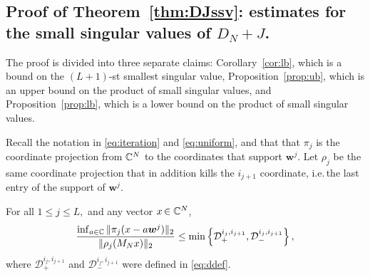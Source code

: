 \documentclass{amsart}
\numberwithin{equation}{section}
\def\corAB{}
\def\corOZ{}
\begin{document}
\subsection{ Proof of Theorem~\ref{thm:DJssv}:
  estimates for the small singular values of $D_N + J$.}\label{sec:pfDJssv}
The proof is
divided
into three separate claims: \corAB{Corollary~\ref{cor:lb},}
\corOZ{which is a} bound on the $(L+1)$-st smallest singular value,
\corAB{Proposition~\ref{prop:ub},} \corOZ{which is an}
\corAB{upper bound on the product of small singular values,
  and Proposition~\ref{prop:lb},}
\corOZ{which is a lower bound on the product of small singular values.}

Recall
the notation in \eqref{eq:iteration} and \eqref{eq:uniform}, and that
that $\pi_j$ is the coordinate projection from $\mathbb{C}^N$ to the coordinates that support ${\bm w}^j.$  Let $\corAB{\rho_j}$ be the same coordinate projection that in addition kills the $i_{j+1}$ coordinate, i.e.\,the last entry of the support of ${\bm w}^j$.
\begin{lemma}
  For all $1\leq j \leq \corAB{L},$ and any vector ${x}\,  \corAB{\in \C^N}$,
  \[
    \frac{
      \inf_{a \in \C} \|\pi_j({x} - a{\bm w}^{j})\|_2
    }{
      \| \corAB{\rho_j}( M_N {x})\|_2
    }
    \leq
    \min\left\{
      \mathcal{D}_{+}^{i_j,i_{j+1}},
      \mathcal{D}_{-}^{i_j,i_{j+1}}
    \right\},
  \]
  where $\corAB{\mathcal{D}_{+}^{i_j,i_{j+1}}}$ and $\corAB{\mathcal{D}_{-}^{i_j, i_{j+1}}}$ were defined in \eqref{eq:ddef}.
\label{lem:localstructure}
\end{lemma}
\end{document}
